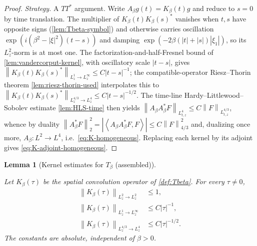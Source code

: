 \documentclass[11pt,oneside]{book}
\providecommand{\uses}[1]{}
\newtheorem{lemma}[theorem]{Lemma}
\theoremstyle{definition}
\theoremstyle{remark}
\newcommand{\1}{\mathbf 1}
\newcommand{\norm}[1]{\left\lVert #1\right\rVert}
\newcommand{\pair}[2]{\left\langle #1,#2\right\rangle}
\begin{document}
\begin{proof}
\uses{lem:Tbeta-symbol, lem:vandercorput-kernel, lem:riesz-thorin-used, lem:HLS-time}
\emph{Strategy.} A $TT^*$ argument. Write $A_\beta g(t)=K_\beta(t)g$ and reduce to $s=0$ by
time translation. The multiplier of $K_\beta(t)K_\beta(s)^*$ vanishes when $t,s$ have
opposite signs (\cref{lem:Tbeta-symbol}) and otherwise carries oscillation
$\exp(i(\beta^2-|\xi|^2)(t-s))$ and damping $\exp(-2\beta(|t|+|s|)|\xi_1|)$, so its
$L^2_z$-norm is at most one. The factorization-and-half-Fresnel bound of
\cref{lem:vandercorput-kernel}, with oscillatory scale $|t-s|$, gives
$\norm{K_\beta(t)K_\beta(s)^*}_{L^1_z\to L^\infty_z}\le C|t-s|^{-1}$; the compatible-operator
Riesz--Thorin theorem \cref{lem:riesz-thorin-used} interpolates this to
$\norm{K_\beta(t)K_\beta(s)^*}_{L^{4/3}_z\to L^4_z}\le C|t-s|^{-1/2}$. The time-line
Hardy--Littlewood--Sobolev estimate \cref{lem:HLS-time} then yields
$\norm{A_\beta A_\beta^*F}_{L^4_{t,z}}\le C\norm F_{L^{4/3}_{t,z}}$, whence by duality
$\norm{A_\beta^*F}_2^2=|\pair{A_\beta A_\beta^*F}{F}|\le C\norm F_{4/3}^2$ and, dualizing
once more, $A_\beta:L^2\to L^4$, i.e.\ \eqref{eq:K-homogeneous}. Replacing each kernel by its
adjoint gives \eqref{eq:K-adjoint-homogeneous}.
\end{proof}

\begin{lemma}[Kernel estimates for $T_\beta$ (assembled)]\label{lem:Tbeta-kernel}
\uses{def:Tbeta}
Let $K_\beta(\tau)$ be the spatial convolution operator of \cref{def:Tbeta}. For every
$\tau\ne0$,
\begin{align}
 \norm{K_\beta(\tau)}_{L^2_z\to L^2_z}      &\le1,          \label{eq:K-L2b}\\
 \norm{K_\beta(\tau)}_{L^1_z\to L^\infty_z} &\le C|\tau|^{-1},   \label{eq:K-disp}\\
 \norm{K_\beta(\tau)}_{L^{4/3}_z\to L^4_z}  &\le C|\tau|^{-1/2}. \label{eq:K-43-4}
\end{align}
The constants are absolute, independent of $\beta>0$.
\end{lemma}
\end{document}
